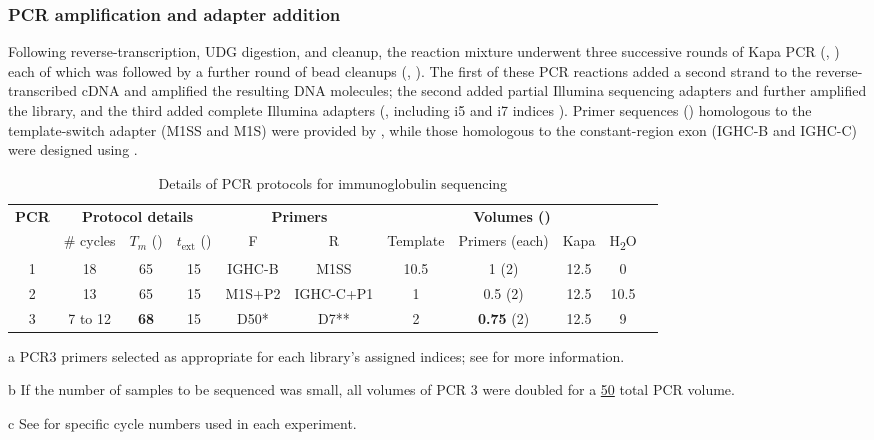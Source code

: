 \subsubsection{PCR amplification and adapter addition} 
\label{sec:methods_molec_igseq_pcr}

Following reverse-transcription, UDG digestion, and cleanup, the reaction mixture underwent three successive rounds of Kapa PCR (, ) each of which was followed by a further round of bead cleanups (, ). The first of these PCR reactions added a second strand to the reverse-transcribed cDNA and amplified the resulting DNA molecules; the second added partial Illumina sequencing adapters and further amplified the library, and the third added complete Illumina adapters (, including i5 and i7 indices \parencite{illumina2018adapters}). Primer sequences () homologous to the template-switch adapter (M1SS and M1S) were provided by \parencite{turchaninova2016igprep}, while those homologous to the  constant-region exon (IGHC-B and IGHC-C) were designed using  \parencite{untergasser2012primer3}.

\begin{table}[h]
\def\arraystretch{1.3}
\centering\small
\begin{threeparttable}
\caption{Details of PCR protocols for \Nfu immunoglobulin sequencing}
\begin{tabular}{c|ccc|cc|ccccc}\toprule
\multirow{2}{*}{\textbf{PCR}} & \multicolumn{3}{c|}{\textbf{Protocol details}} & \multicolumn{2}{c|}{\textbf{Primers}} & \multicolumn{4}{c}{\textbf{Volumes (\ul{})\tnote{b}}}\\
 & \# cycles & $T_m$ (\degC{}) & $t_\mathrm{ext}$ (\secs{}) & F & R & Template & Primers (each) & Kapa & H\textsubscript{2}O \\\midrule
1 & 18 & 65 & 15 & IGHC-B & M1SS & 10.5 & 1 (\x{}2) & 12.5 & 0 \\\midrule
2 & 13 & 65 & 15 & M1S+P2 & IGHC-C+P1 & 1 & 0.5 (\x{}2) & 12.5 & 10.5 \\\midrule
3 & 7 to 12\tnote{c} & \textbf{68} & 15 & D50*\tnote{a} & D7**\tnote{a} & 2 & \textbf{0.75} (\x{}2) & 12.5 & 9 \\
\bottomrule
\end{tabular}
\begin{tablenotes}
\item[a] PCR3 primers selected as appropriate for each library's assigned indices; see  for more information.
\item[b] If the number of samples to be sequenced was small, all volumes of PCR 3 were doubled for a \ul{50} total PCR volume.
\item[c] See  for specific cycle numbers used in each experiment.
\end{tablenotes}
\label{tab:methods_igseq_pcr}
\end{threeparttable}
\end{table}

